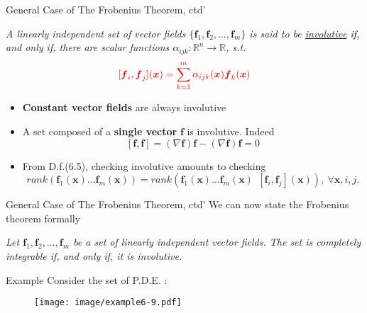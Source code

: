 \documentclass{beamer}
\renewcommand{\vec}[1]{\ensuremath{\boldsymbol{#1}}} %
\begin{document}
\begin{frame}{General Case of The Frobenius Theorem, ctd'}
\begin{definition}[6.5]
    \textit{
    A linearly independent set of vector fields $ \{ \vec{f}_{1}, \vec{f}_{2}, \dots, \vec{f}_{m} \} $ is said to be \underline{involutive} if, and only if, there are scalar functions $\alpha_{ijk} : \mathbb{R}^{n} \rightarrow \mathbb{R} $, s.t.
    \vspace{-10pt}
        \begin{equation}\label{involutive-equation}
          {\color{red}[\vec{f}_{i}, \vec{f}_{j}](\vec{x}) = \sum_{k=1}^{m}\alpha_{ijk}(\vec{x})\vec{f}_{k}(\vec{x})}
        \end{equation}
    }
\end{definition}
\vspace{-20pt}
\begin{itemize}
  \item \textbf{Constant vector fields} are always involutive
  \item A set composed of a \textbf{single vector} \vec{f} is involutive. Indeed
  $$
  [\vec{f},\vec{f}] = (\nabla \vec{f})\vec{f} - (\nabla \vec{f})\vec{f} = 0
  $$
  \item From D.f.(6.5), checking involutive amounts to checking
  $$
  rank(\vec{f}_{1}(\vec{x}) \dots \vec{f}_{m}(\vec{x})) = rank(\vec{f}_{1}(\vec{x}) \dots \vec{f}_{m}(\vec{x}) ~~ [\vec{f}_{i}, \vec{f}_{j}](\vec{x})),~ \forall \vec{x},i,j.
  $$
\end{itemize}
\end{frame}


\begin{frame}{General Case of The Frobenius Theorem, ctd'}
    We can now state the Frobenius theorem formally
    \vspace{+20pt}
    \begin{theorem}[6.1 Frobenius]
    \textit{
      Let $\vec{f}_{1}, \vec{f}_{2}, \dots, \vec{f}_{m}$ be a set of linearly independent vector fields. The set is {\color{red}completely integrable} if, and only if, it is {\color{red}involutive}.
    }
\end{theorem}
\end{frame}


\begin{frame}{Example}
Consider the set of P.D.E. :
\vspace{-20pt}
    \begin{figure}
      \centering
      \texttt{[image: image/example6-9.pdf]}
    \end{figure}
\end{frame}
\end{document}
